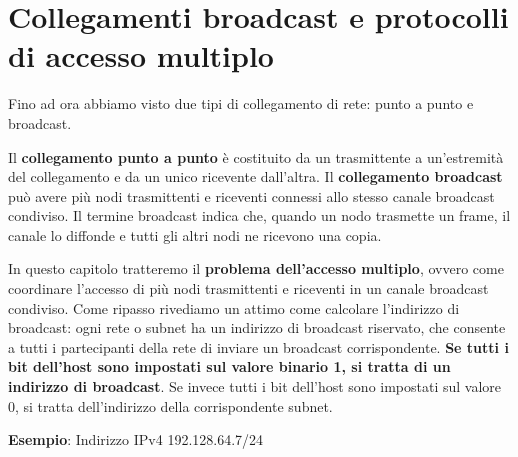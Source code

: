 \documentclass[11pt,a4paper]{book}
\begin{document}
\section{Collegamenti broadcast e protocolli di accesso multiplo} \label{par: accesso multiplo}
Fino ad ora abbiamo visto due tipi di collegamento di rete: punto a punto e broadcast.

Il \textbf{collegamento punto a punto} è costituito da un trasmittente a un'estremità del collegamento e da un unico ricevente dall'altra. Il \textbf{collegamento broadcast} può avere più nodi trasmittenti e riceventi connessi allo stesso canale broadcast condiviso.  Il termine broadcast indica che, quando un nodo trasmette un frame, il canale lo diffonde e tutti gli altri nodi ne ricevono una copia.

In questo capitolo tratteremo il \textbf{problema dell'accesso multiplo}, ovvero come coordinare l'accesso di più nodi trasmittenti e riceventi in un canale broadcast condiviso. Come ripasso rivediamo un attimo come calcolare l'indirizzo di broadcast: ogni rete o subnet ha un indirizzo di broadcast riservato, che consente a tutti i partecipanti della rete di inviare un broadcast corrispondente. \textbf{Se tutti i bit dell'host sono impostati sul valore binario 1, si tratta di un indirizzo di broadcast}. Se invece tutti i bit dell'host sono impostati sul valore 0, si tratta dell'indirizzo della corrispondente subnet. \label{pag: 001} 

\textbf{Esempio}: Indirizzo IPv4 192.128.64.7/24
\end{document}
